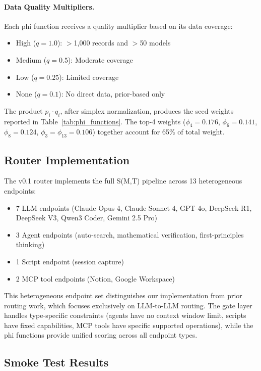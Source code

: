 \paragraph{Data Quality Multipliers.} Each phi function receives a quality multiplier based on its data coverage:
\begin{itemize}
    \item High ($q=1.0$): $>$1,000 records and $>$50 models
    \item Medium ($q=0.5$): Moderate coverage
    \item Low ($q=0.25$): Limited coverage
    \item None ($q=0.1$): No direct data, prior-based only
\end{itemize}

The product $p_i \cdot q_i$, after simplex normalization, produces the seed weights reported in Table~\ref{tab:phi_functions}. The top-4 weights ($\phi_4 = 0.176$, $\phi_6 = 0.141$, $\phi_8 = 0.124$, $\phi_3 = \phi_{13} = 0.106$) together account for 65\% of total weight.

\subsection{Router Implementation}

The v0.1 router implements the full S(M,T) pipeline across 13 heterogeneous endpoints:

\begin{itemize}
    \item 7 LLM endpoints (Claude Opus 4, Claude Sonnet 4, GPT-4o, DeepSeek R1, DeepSeek V3, Qwen3 Coder, Gemini 2.5 Pro)
    \item 3 Agent endpoints (auto-search, mathematical verification, first-principles thinking)
    \item 1 Script endpoint (session capture)
    \item 2 MCP tool endpoints (Notion, Google Workspace)
\end{itemize}

This heterogeneous endpoint set distinguishes our implementation from prior routing work, which focuses exclusively on LLM-to-LLM routing. The gate layer handles type-specific constraints (agents have no context window limit, scripts have fixed capabilities, MCP tools have specific supported operations), while the phi functions provide unified scoring across all endpoint types.

\subsection{Smoke Test Results}

